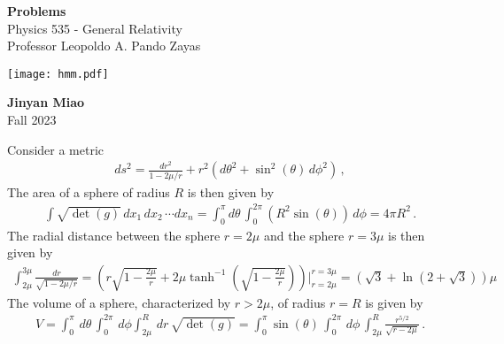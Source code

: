\documentclass[11pt, onesided]{book}
\theoremstyle{break}
\theoremstyle{break}
\begin{document}
	\begin{titlepage}
		\begin{center}
			\vspace*{0.5cm}
			\Huge \color{red}
				\textbf{Problems}\\
			\vspace{0.5cm}			
			\Large \color{black}
			Physics 535 - General Relativity\\
			Professor Leopoldo A. Pando Zayas
			\vspace{1.5cm}

			\texttt{[image: hmm.pdf]}
			
			
			\vspace{2cm}
			\LARGE
				\textbf{Jinyan Miao}\\
				\hfill\break
				\LARGE Fall 2023\\
			\vspace{1cm}

		\vspace*{\fill}
		\end{center}			
	\end{titlepage}



\tableofcontents
\hfill\break
\hfill\break
\hfill\break
 

\newpage
Consider a metric
\begin{align*}
ds^2 = \frac{dr^2}{1-2\mu/r} + r^2(d\theta^2 + \sin^2(\theta) \, d\phi^2)\,,
\end{align*}
The area of a sphere of radius $R$ is then given by
\begin{align*}
\int \sqrt{\det(g)}\, dx_1\,dx_2\,\cdots dx_n = \int_0^\pi d\theta \, \int_{0}^{2\pi}(R^2 \sin(\theta))\, d\phi = 4\pi R^2\,.
\end{align*}
The radial distance between the sphere $r = 2\mu$ and the sphere $r = 3\mu$ is then given by
\begin{align*}
\int_{2\mu}^{3\mu} \frac{dr}{\sqrt{1- 2\mu/r}} = \left( r\sqrt{1- \frac{2\mu}{r}} + 2\mu \tanh^{-1}\left( \sqrt{1- \frac{2\mu}{r}}\right) \right)|^{r=3\mu}_{r = 2\mu} = (\sqrt{3} + \ln(2+\sqrt{3})) \mu
\end{align*}
The volume of a sphere, characterized by $r > 2\mu$, of radius $r = R$ is given by
\begin{align*}
V = \int_0^\pi \,d\theta \, \int_0^{2\pi}\, d\phi \int_{2\mu}^R \, dr\, \sqrt{\det(g)} = \int_0^\pi \sin(\theta) \, \int_0^{2\pi}\,d\phi \,\int_{2\mu}^R \frac{r^{5/2}}{\sqrt{r- 2\mu}}\,.
\end{align*}
\end{document}
